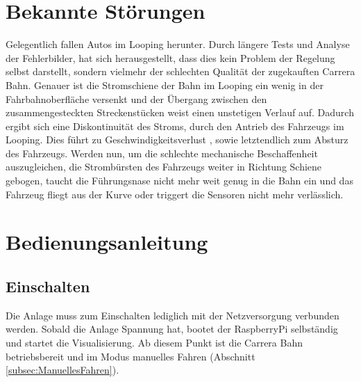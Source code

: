\documentclass[a4paper, 11pt]{report}
\begin{document}
\chapter{Bekannte Störungen}\label {cha:err}
Gelegentlich fallen Autos im Looping herunter. 
Durch längere Tests und Analyse der Fehlerbilder, hat sich herausgestellt, dass dies kein Problem der Regelung selbst darstellt, sondern vielmehr der schlechten Qualität der zugekauften Carrera Bahn.
Genauer ist die Stromschiene der Bahn im Looping ein wenig in der Fahrbahnoberfläche versenkt und der Übergang zwischen den zusammengesteckten Streckenstücken weist einen unstetigen Verlauf auf. Dadurch ergibt sich eine Diskontinuität des Stroms, durch den Antrieb des Fahrzeugs im Looping. Dies führt zu Geschwindigkeitsverlust , sowie letztendlich zum Absturz des Fahrzeugs. Werden nun, um die schlechte mechanische Beschaffenheit auszugleichen,  die Strombürsten des Fahrzeugs weiter in Richtung Schiene gebogen, taucht die Führungsnase nicht mehr weit genug in die Bahn ein und das Fahrzeug fliegt aus der Kurve oder triggert die Sensoren nicht mehr verlässlich.

\chapter{Bedienungsanleitung}
\section{Einschalten}
	Die Anlage muss zum Einschalten lediglich mit der Netzversorgung verbunden werden. Sobald die Anlage Spannung hat, bootet der RaspberryPi selbständig und startet die Visualisierung. Ab diesem Punkt ist die Carrera Bahn betriebsbereit und im Modus manuelles Fahren (Abschnitt \ref{subsec:ManuellesFahren}).
\end{document}
